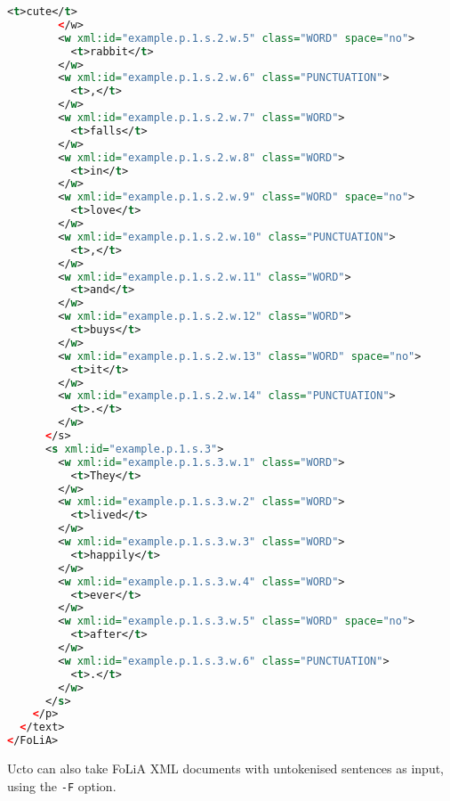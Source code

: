 \documentclass[a4paper,12pt]{report}
\begin{document}
\begin{lstlisting}[language=xml]
          <t>cute</t>
        </w>
        <w xml:id="example.p.1.s.2.w.5" class="WORD" space="no">
          <t>rabbit</t>
        </w>
        <w xml:id="example.p.1.s.2.w.6" class="PUNCTUATION">
          <t>,</t>
        </w>
        <w xml:id="example.p.1.s.2.w.7" class="WORD">
          <t>falls</t>
        </w>
        <w xml:id="example.p.1.s.2.w.8" class="WORD">
          <t>in</t>
        </w>
        <w xml:id="example.p.1.s.2.w.9" class="WORD" space="no">
          <t>love</t>
        </w>
        <w xml:id="example.p.1.s.2.w.10" class="PUNCTUATION">
          <t>,</t>
        </w>
        <w xml:id="example.p.1.s.2.w.11" class="WORD">
          <t>and</t>
        </w>
        <w xml:id="example.p.1.s.2.w.12" class="WORD">
          <t>buys</t>
        </w>
        <w xml:id="example.p.1.s.2.w.13" class="WORD" space="no">
          <t>it</t>
        </w>
        <w xml:id="example.p.1.s.2.w.14" class="PUNCTUATION">
          <t>.</t>
        </w>
      </s>
      <s xml:id="example.p.1.s.3">
        <w xml:id="example.p.1.s.3.w.1" class="WORD">
          <t>They</t>
        </w>
        <w xml:id="example.p.1.s.3.w.2" class="WORD">
          <t>lived</t>
        </w>
        <w xml:id="example.p.1.s.3.w.3" class="WORD">
          <t>happily</t>
        </w>
        <w xml:id="example.p.1.s.3.w.4" class="WORD">
          <t>ever</t>
        </w>
        <w xml:id="example.p.1.s.3.w.5" class="WORD" space="no">
          <t>after</t>
        </w>
        <w xml:id="example.p.1.s.3.w.6" class="PUNCTUATION">
          <t>.</t>
        </w>
      </s>
    </p>
  </text>
</FoLiA>
\end{lstlisting}    

Ucto can also take FoLiA XML documents with untokenised sentences as input, using the \texttt{-F} option.



\end{document}
